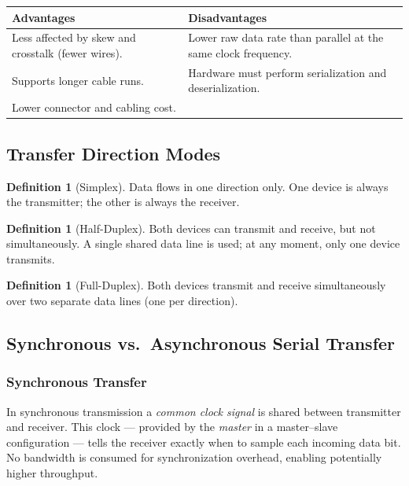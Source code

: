 \documentclass[11pt, a4paper, notitlepage]{report}
\theoremstyle{definition}
\newtheorem{definition}[theorem]{Definition}
\theoremstyle{remark}
\theoremstyle{definition}
\begin{document}
\begin{center}
\renewcommand{\arraystretch}{1.3}
\begin{tabular}{p{} p{}}
  \toprule
  \textbf{Advantages} & \textbf{Disadvantages} \\
  \midrule
  Less affected by skew and crosstalk (fewer wires). &
  Lower raw data rate than parallel at the same clock frequency. \\
  Supports longer cable runs. &
  Hardware must perform serialization and deserialization. \\
  Lower connector and cabling cost. & \\
  \bottomrule
\end{tabular}
\end{center}

\subsection{Transfer Direction Modes}
\label{sec:transfer-modes}

\begin{definition}[Simplex]
  Data flows in one direction only. One device is always the transmitter; the other is always the receiver.
\end{definition}

\begin{definition}[Half-Duplex]
  Both devices can transmit and receive, but not simultaneously. A single shared data line is used; at any moment, only one device transmits.
\end{definition}

\begin{definition}[Full-Duplex]
  Both devices transmit and receive simultaneously over two separate data lines (one per direction).
\end{definition}

\subsection{Synchronous vs.\ Asynchronous Serial Transfer}
\label{sec:sync-async}

\subsubsection{Synchronous Transfer}

In synchronous transmission a \emph{common clock signal} is shared between transmitter and receiver. This clock — provided by the \emph{master} in a master–slave configuration — tells the receiver exactly when to sample each incoming data bit. No bandwidth is consumed for synchronization overhead, enabling potentially higher throughput.
\end{document}
